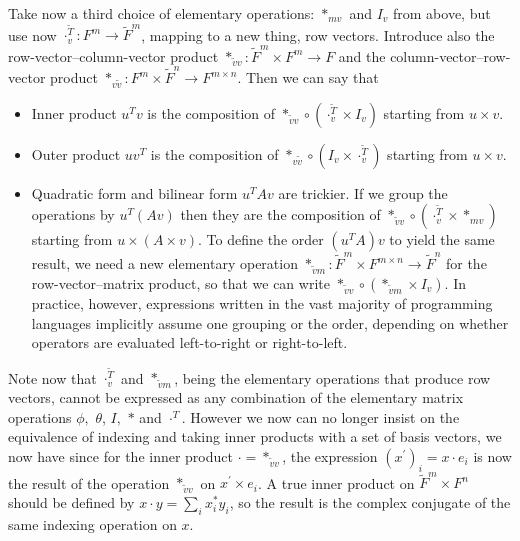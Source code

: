 Take now a third choice of elementary operations: $*_{mv}$ and $I_{v}$
from above, but use now $\cdot_{v}^{\tilde{T}}:F^{m}\rightarrow\tilde{F}^{m}$,
mapping to a new thing, row vectors. Introduce also the row-vector–column-vector
product $*_{\tilde{v}v}:\tilde{F}^{m}\times F^{m}\rightarrow F$ and
the column-vector–row-vector product $*_{v\tilde{v}}:F^{m}\times\tilde{F}^{n}\rightarrow F^{m\times n}$.
Then we can say that
\begin{itemize}
\item Inner product $u^{T}v$ is the composition of $*_{\tilde{v}v}\circ\left(\cdot_{v}^{\tilde{T}}\times I_{v}\right)$
starting from $u\times v$.
\item Outer product $uv^{T}$ is the composition of $*_{v\tilde{v}}\circ\left(I_{v}\times\cdot_{v}^{\tilde{T}}\right)$
starting from $u\times v$.
\item Quadratic form and bilinear form $u^{T}Av$ are trickier. If we group
the operations by $u^{T}\left(Av\right)$ then they are the composition
of $*_{\tilde{v}v}\circ\left(\cdot_{v}^{\tilde{T}}\times*_{mv}\right)$
starting from $u\times\left(A\times v\right)$. To define the order
$\left(u^{T}A\right)v$ to yield the same result, we need a new elementary
operation $*_{\tilde{v}m}:\tilde{F}^{m}\times F^{m\times n}\rightarrow\tilde{F}^{n}$
for the row-vector–matrix product, so that we can write $*_{\tilde{v}v}\circ\left(*_{\tilde{v}m}\times I_{v}\right)$.
In practice, however, expressions written in the vast majority of
programming languages implicitly assume one grouping or the order,
depending on whether operators are evaluated left-to-right or right-to-left.
\end{itemize}
Note now that $\cdot_{v}^{\tilde{T}}$ and $*_{\tilde{v}m}$, being
the elementary operations that produce row vectors, cannot be expressed
as any combination of the elementary matrix operations $\phi,$ $\theta$,
$I,$ $*$ and $\cdot^{T}$. However we now can no longer insist on
the equivalence of indexing and taking inner products with a set of
basis vectors, we now have since for the inner product $\cdot=*_{\tilde{v}v}$,
the expression $\left(x^{\prime}\right)_{i}=x\cdot e_{i}$ is now
the result of the operation $*_{\tilde{v}v}$ on $x^{\prime}\times e_{i}$.
A true inner product on $\tilde{F}^{m}\times F^{n}$ should be defined
by $x\cdot y=\sum_{i}x_{i}^{*}y_{i}$, so the result is the complex
conjugate of the same indexing operation on $x$.

